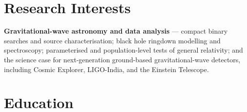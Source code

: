 
\section{Research Interests}

\textbf{Gravitational-wave astronomy and data analysis} --- compact binary searches and source characterisation; black hole ringdown modelling and spectroscopy; parameterised and population-level tests of general relativity; and the science case for next-generation ground-based gravitational-wave detectors, including Cosmic Explorer, LIGO-India, and the Einstein Telescope.

\section{Education}

